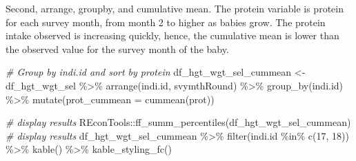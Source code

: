 \documentclass[
]{book}
\newenvironment{Shaded}{\begin{snugshade}}{\end{snugshade}}
\newcommand{\AttributeTok}[1]{\textcolor[rgb]{0.77,0.63,0.00}{#1}}
\newcommand{\CommentTok}[1]{\textcolor[rgb]{0.56,0.35,0.01}{\textit{#1}}}
\newcommand{\DecValTok}[1]{\textcolor[rgb]{0.00,0.00,0.81}{#1}}
\newcommand{\FunctionTok}[1]{\textcolor[rgb]{0.00,0.00,0.00}{#1}}
\newcommand{\NormalTok}[1]{#1}
\newcommand{\OtherTok}[1]{\textcolor[rgb]{0.56,0.35,0.01}{#1}}
\newcommand{\SpecialCharTok}[1]{\textcolor[rgb]{0.00,0.00,0.00}{#1}}
\begin{document}
Second, arrange, groupby, and cumulative mean. The protein variable is protein for each survey month, from month 2 to higher as babies grow. The protein intake observed is increasing quickly, hence, the cumulative mean is lower than the observed value for the survey month of the baby.

\begin{Shaded}
\begin{Highlighting}[]
\CommentTok{\# Group by indi.id and sort by protein}
\NormalTok{df\_hgt\_wgt\_sel\_cummean }\OtherTok{\textless{}{-}}\NormalTok{ df\_hgt\_wgt\_sel }\SpecialCharTok{\%\textgreater{}\%}
  \FunctionTok{arrange}\NormalTok{(indi.id, svymthRound) }\SpecialCharTok{\%\textgreater{}\%}
  \FunctionTok{group\_by}\NormalTok{(indi.id) }\SpecialCharTok{\%\textgreater{}\%}
  \FunctionTok{mutate}\NormalTok{(}\AttributeTok{prot\_cummean =} \FunctionTok{cummean}\NormalTok{(prot))}

\CommentTok{\# display results}
\NormalTok{REconTools}\SpecialCharTok{::}\FunctionTok{ff\_summ\_percentiles}\NormalTok{(df\_hgt\_wgt\_sel\_cummean)}
\CommentTok{\# display results}
\NormalTok{df\_hgt\_wgt\_sel\_cummean }\SpecialCharTok{\%\textgreater{}\%} \FunctionTok{filter}\NormalTok{(indi.id }\SpecialCharTok{\%in\%} \FunctionTok{c}\NormalTok{(}\DecValTok{17}\NormalTok{, }\DecValTok{18}\NormalTok{)) }\SpecialCharTok{\%\textgreater{}\%} 
  \FunctionTok{kable}\NormalTok{() }\SpecialCharTok{\%\textgreater{}\%} \FunctionTok{kable\_styling\_fc}\NormalTok{()}
\end{Highlighting}
\end{Shaded}
\end{document}
